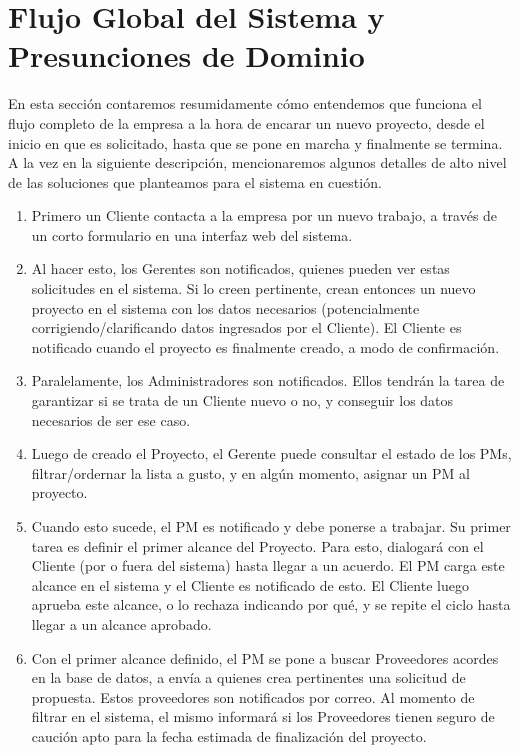 \section{Flujo Global del Sistema y Presunciones de Dominio}

En esta sección contaremos resumidamente cómo entendemos que funciona 
el flujo completo de la empresa a la hora de encarar un nuevo proyecto, 
desde el inicio en que es solicitado, hasta que se pone en marcha y finalmente 
se termina. A la vez en la siguiente descripción, mencionaremos algunos detalles 
de alto nivel de las soluciones que planteamos para el sistema en cuestión. 

\begin{enumerate}
    \item Primero un Cliente contacta a la empresa por un nuevo trabajo, 
    a través de un corto formulario en una interfaz web del sistema. 
    
    \item Al hacer esto, los Gerentes son notificados, quienes pueden ver 
    estas solicitudes en el sistema. Si lo creen pertinente, crean entonces 
    un nuevo proyecto en el sistema con los datos necesarios (potencialmente 
    corrigiendo/clarificando datos ingresados por el Cliente). El Cliente 
    es notificado cuando el proyecto es finalmente creado, a modo de confirmación. 
    
    \item Paralelamente, los Administradores son notificados. Ellos tendrán la 
    tarea de garantizar si se trata de un Cliente nuevo o no, y conseguir los 
    datos necesarios de ser ese caso. 
    
    \item Luego de creado el Proyecto, el Gerente puede consultar el estado 
    de los PMs, filtrar/ordernar la lista a gusto, y en algún momento, 
    asignar un PM al proyecto. 
    
    \item Cuando esto sucede, el PM es notificado y debe ponerse a trabajar. 
    Su primer tarea es definir el primer alcance del Proyecto. Para esto, 
    dialogará con el Cliente (por o fuera del sistema) hasta llegar a un acuerdo. 
    El PM carga este alcance en el sistema y el Cliente es notificado de esto. 
    El Cliente luego aprueba este alcance, o lo rechaza indicando por qué, y 
    se repite el ciclo hasta llegar a un alcance aprobado. 
    
    \item Con el primer alcance definido, el PM se pone a buscar Proveedores 
    acordes en la base de datos, a envía a quienes crea pertinentes una solicitud 
    de propuesta. Estos proveedores son notificados por correo. Al momento de filtrar 
    en el sistema, el mismo informará si los Proveedores tienen seguro de caución apto 
    para la fecha estimada de finalización del proyecto. 
    

\end{enumerate}
